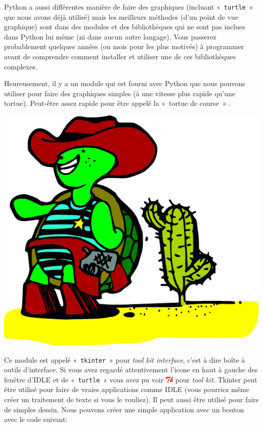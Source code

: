 Python a aussi différentes manière de faire des graphiques (incluant « \texttt{turtle} »  que nous avons déjà utilisé) mais les meilleurs méthodes (d'un point de vue graphique) sont dans des modules et des bibliothèques qui ne sont pas inclues dans Python lui même (ni dans aucun autre langage).
Vous passerez probablement quelques années (ou mois pour les plus motivés) à programmer avant de comprendre comment installer et utiliser une de ces bibliothèques complexes.

Heureusement, il y a un module qui est fourni avec Python que nous pouvons utiliser pour faire des graphiques simples (à une vitesse plus rapide qu'une tortue). Peut-être assez rapide pour être appelé la « tortue de course » .
\begin{center}
\includegraphics[scale=1]{images/tortue_rapide}
\end{center}

Ce module est appelé « \texttt{tkinter} » pour \emph{tool kit interface}, c'est à dire boîte à outils d'interface.
Si vous avez regardé  attentivement l'icone en haut à gauche des fenêtre d'IDLE et de « \texttt{turtle} » vous avez pu voir \includegraphics[scale=1]{images/tk} pour \emph{tool kit}. Tkinter peut être utilisé pour faire de vraies applications comme IDLE (vous pourriez même créer un traitement de texte si vous le vouliez). Il peut aussi être utilisé pour faire de simples dessin. Nous pouvons créer une simple application avec un bouton avec le code suivant:

